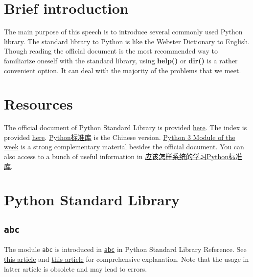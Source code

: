\documentclass[english]{../TeXTemplate/pkupaper}
\title{\titlemark}
\author{Yifei Wang\quad pppppass}
\date{Updated on February 26, 2018}
\begin{document}
\raggedright

\maketitle
\tableofcontents
\section{Brief introduction}
The main purpose of this speech is to introduce several commonly used Python library. The standard library to Python is like the Webster Dictionary to English. Though reading the official document is the most recommended way to familiarize oneself with the standard library, using \textbf{help()} or \textbf{dir()} is a rather convenient option. It can deal with the majority of the problems that we meet. 

\section{Resources}
The official document of Python Standard Library is provided \href{https://docs.python.org/3.6/library/index.html}{here}. The index is provided \href{https://docs.python.org/3.6/py-modindex.html}{here}.  \href{http://python.usyiyi.cn/translate/python_352/library/index.html}{Python标准库} is the Chinese version. \href{https://pymotw.com/3/index.html}{Python 3 Module of the week} is a strong complementary material besides the official document. You can also access to a bunch of useful information in \href{https://www.zhihu.com/question/22100190}{应该怎样系统的学习Python标准库}.

\section{Python Standard Library}








\subsection{\texttt{abc}}

The module \verb"abc" is introduced in \href{https://docs.python.org/3/library/abc.html}{\texttt{abc}} in Python Standard Library Reference. See \href{https://segmentfault.com/a/1190000007921371}{this article} and \href{https://www.jianshu.com/p/19ed49293168}{this article} for comprehensive explanation. Note that the usage in latter article is obsolete and may lead to errors.
\end{document}
